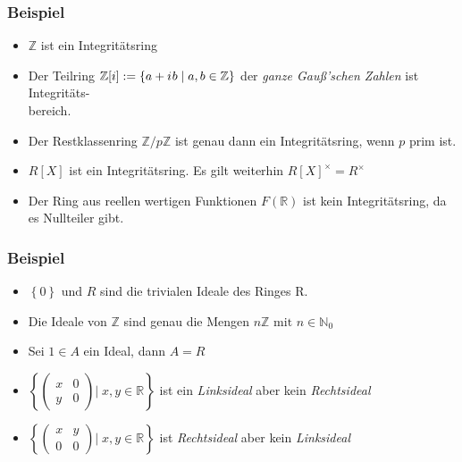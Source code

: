 \documentclass[12pt]{article}
\begin{document}
\subsubsection*{Beispiel}
\begin{itemize}
	\item  $ \mathbb{Z}  $ ist ein Integritätsring
	\item Der Teilring $ \mathbb{Z}[i] := \left\{ a + {i\mkern1mu} b \; | \; a, b \in  \mathbb{Z}\right\} $ 
		der \textit{ganze Gauß'schen Zahlen} ist Integritäts-\\bereich.
	\item Der Restklassenring $ \mathbb{Z} / p \mathbb{Z}  $ ist genau dann ein Integritätsring, wenn 
		$ p $ prim ist.
	\item $ R[X] $ ist ein Integritätsring. Es gilt weiterhin $ R[X]^{\times} = R^{\times} $ 
	\item Der Ring aus reellen wertigen Funktionen $ F (\mathbb{R}) $ ist kein Integritätsring, da es Nullteiler gibt. 
\end{itemize}


\subsubsection*{Beispiel}
\begin{itemize}
	\item $ \left\{ 0 \right\} \text{ und } R $ sind die trivialen Ideale des Ringes R.
	\item Die Ideale von $ \mathbb{Z}  $ sind genau die Mengen $ n \mathbb{Z}  \text{ mit } n \in \mathbb{N}_{0}$ 
	\item Sei $ 1 \in A $ ein Ideal, dann $ A = R $ 
	\item $ \left\{ \begin{pmatrix}x &0 \\ y &0 \end{pmatrix} | \; x, y \in \mathbb{R} \right\}  $ ist ein 
		\textit{Linksideal} aber kein \textit{Rechtsideal} 
	\item $ \left\{ \begin{pmatrix}x &y \\ 0 &0 \end{pmatrix} | \; x, y \in \mathbb{R} \right\}  $ ist 
		\textit{Rechtsideal} aber kein \textit{Linksideal} 
\end{itemize}
\end{document}
